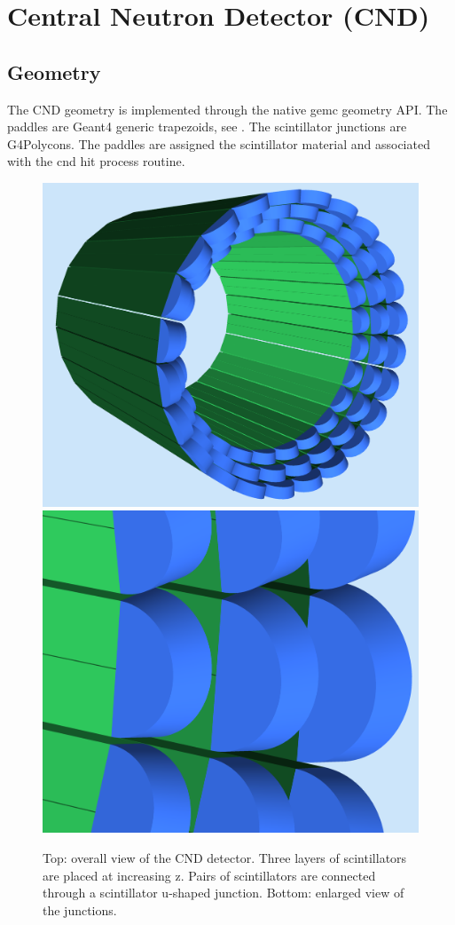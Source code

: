 \section{Central Neutron Detector (CND)}

\subsection{Geometry}

The CND geometry is implemented through the native gemc geometry API.
The paddles are Geant4 generic trapezoids, see . The scintillator junctions are G4Polycons.
The paddles are assigned the scintillator material and associated with the cnd hit process routine.

\begin{figure}
	\centering
	\includegraphics[width=0.95\columnwidth,keepaspectratio]{img/cndGeometry.png}
	\includegraphics[width=0.95\columnwidth,keepaspectratio]{img/cndDetail.png}
	\caption{Top: overall view of the CND detector. Three layers of scintillators are placed at increasing z. Pairs of scintillators
            are connected through a scintillator u-shaped junction. Bottom: enlarged view of the junctions. }
	\label{fig:cndGeometry}
\end{figure}


